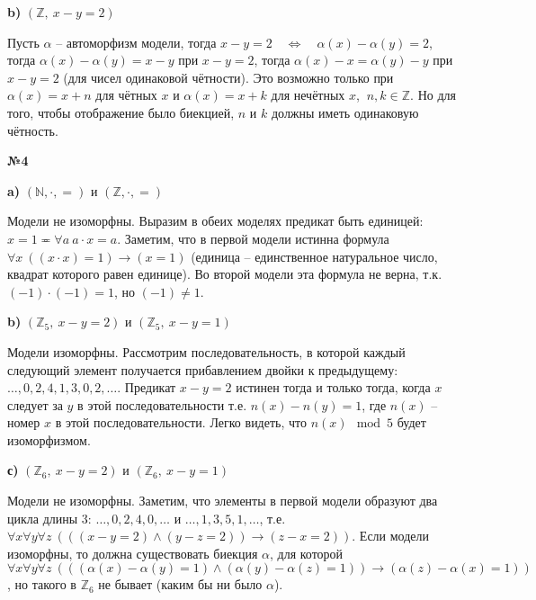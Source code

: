 \documentclass{article}
\newenvironment{task}{\begin{center}\fontsize{14}{14}\selectfont\bf}{\rm\fontsize{12}{12}\selectfont\end{center}}
\newcommand{\impl}{\quad \Leftrightarrow \quad}
\begin{document}
	\begin{center}
		\textbf{b)} $(\mathbb{Z}, \ x-y=2)$  
	\end{center}
	Пусть $\alpha$ -- автоморфизм модели, тогда $x-y=2 \impl \alpha(x) - \alpha(y) = 2$, тогда $\alpha(x) - \alpha(y) = x - y$ при $x - y = 2$, тогда $\alpha(x) - x = \alpha(y) - y$ при $x - y = 2$ (для чисел одинаковой чётности). Это возможно только при $\alpha(x) = x + n$ для чётных $x$ и $\alpha(x) = x + k$ для нечётных $x$, $ \ n, k \in \mathbb{Z}$. Но для того, чтобы отображение было биекцией, $n$ и $k$ должны иметь одинаковую чётность.

	
	
	\begin{task} 
		№4
	\end{task}
	\begin{center}
		\textbf{a)} $(\mathbb{N}, \cdot, =)$ и $(\mathbb{Z}, \cdot, =)$
	\end{center}
	Модели не изоморфны. Выразим в обеих моделях предикат быть единицей: $x = 1 \eqcirc \forall a\ a\cdot x = a$. Заметим, что в первой модели истинна формула $\forall x\ ((x\cdot x) = 1) \rightarrow (x = 1)$ (единица -- единственное натуральное число, квадрат которого равен единице). Во второй модели эта формула не верна, т.к. $(-1)\cdot(-1) = 1$, но $(-1) \not = 1$. 
	
	
	\begin{center}
		\textbf{b)} $(\mathbb{Z}_5, \ x - y = 2)$ и $(\mathbb{Z}_5, \ x - y = 1)$  
	\end{center}
	Модели изоморфны. Рассмотрим последовательность, в которой каждый следующий элемент получается прибавлением двойки к предыдущему: $\dots, 0, 2, 4, 1, 3, 0, 2, \dots$. Предикат $x - y = 2$ истинен тогда и только тогда, когда $x$ следует за $y$ в этой последовательности т.е. $n(x) - n(y) = 1$, где $n(x)$ -- номер $x$ в этой последовательности. Легко видеть, что $n(x) \mod 5$ будет изоморфизмом. 
	
	\begin{center}
		\textbf{с)} $(\mathbb{Z}_6, \ x - y = 2)$ и $(\mathbb{Z}_6, \ x - y = 1)$  
	\end{center}
	Модели не изоморфны. Заметим, что элементы в первой модели образуют два цикла длины 3: $\dots, 0, 2, 4, 0, \dots$ и $\dots, 1, 3, 5, 1, \dots$, т.е. $\forall x\forall y\forall z \ (((x - y = 2) \wedge (y - z = 2)) \rightarrow (z - x = 2))$. Если модели изоморфны, то должна существовать биекция $\alpha$, для которой $\forall x\forall y\forall z \ (((\alpha(x) - \alpha(y) = 1) \wedge (\alpha(y) - \alpha(z) = 1)) \rightarrow (\alpha(z) - \alpha(x) = 1))$, но такого в $\mathbb{Z}_6$ не бывает (каким бы ни было $\alpha$).
	
\end{document}
